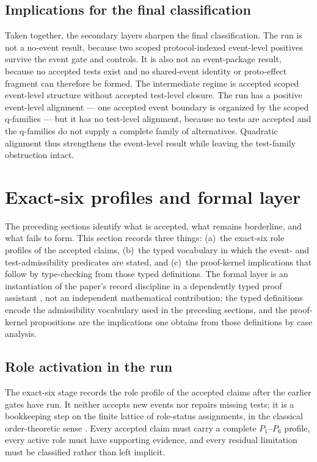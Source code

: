 \documentclass[11pt]{article}
\theoremstyle{definition}
\begin{document}
\subsection{Implications for the final classification}

Taken together, the secondary layers sharpen the final classification. The run is not a no-event result, because two scoped protocol-indexed event-level positives survive the event gate and controls. It is also not an event-package result, because no accepted tests exist and no shared-event identity or proto-effect fragment can therefore be formed. The intermediate regime is accepted scoped event-level structure without accepted test-level closure. The run has a positive event-level alignment — one accepted event boundary is organized by the scoped q-families — but it has no test-level alignment, because no tests are accepted and the q-families do not supply a complete family of alternatives. Quadratic alignment thus strengthens the event-level result while leaving the test-family obstruction intact.
 \section{Exact-six profiles and formal layer}
\label{sec:exact-six-formal}

The preceding sections identify what is accepted, what remains borderline, and what fails to form. This section records three things: (a)~the exact-six role profiles of the accepted claims, (b)~the typed vocabulary in which the event- and test-admissibility predicates are stated, and (c)~the proof-kernel implications that follow by type-checking from those typed definitions. The formal layer is an instantiation of the paper's record discipline in a dependently typed proof assistant \citep{AvigadHarrison2014}, not an independent mathematical contribution: the typed definitions encode the admissibility vocabulary used in the preceding sections, and the proof-kernel propositions are the implications one obtains from those definitions by case analysis.

\subsection{Role activation in the run}

The exact-six stage records the role profile of the accepted claims after the earlier gates have run. It neither accepts new events nor repairs missing tests; it is a bookkeeping step on the finite lattice of role-status assignments, in the classical order-theoretic sense \citep{Tarski1955,DaveyPriestley2002}. Every accepted claim must carry a complete $P_1$--$P_6$ profile, every active role must have supporting evidence, and every residual limitation must be classified rather than left implicit.
\end{document}
